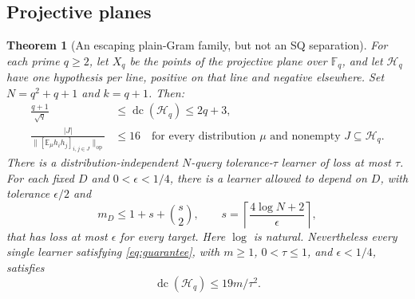 \documentclass[11pt]{article}
\newtheorem{theorem}{Theorem}
\DeclareMathOperator{\dc}{dc}
\newcommand{\E}{\mathbb E}
\newcommand{\1}{\mathbf 1}
\newcommand{\cH}{\mathcal H}
\newcommand{\op}{\mathrm{op}}
\begin{document}
\subsection{Projective planes}
\begin{samepage}
\begin{theorem}[An escaping plain-Gram family, but not an SQ separation]\label{thm:plane}
For each prime $q\geq2$, let $X_q$ be the points of the projective plane over $\mathbb F_q$, and let $\cH_q$ have one hypothesis per line, positive on that line and negative elsewhere. Set $N=q^2+q+1$ and $k=q+1$. Then:
\begin{align}
 \frac{q+1}{\sqrt q}&\leq\dc(\cH_q)\leq2q+3,\label{eq:planedc}\\
 \frac{|J|}{\|[\E_\mu h_i h_j]_{i,j\in J}\|_\op}&\leq16
 \quad\text{for every distribution $\mu$ and nonempty $J\subseteq\cH_q$}.
 \label{eq:planeplain}
\end{align}
There is a distribution-independent $N$-query tolerance-$\tau$ learner of loss at most $\tau$. For each \emph{fixed} $D$ and $0<\epsilon<1/4$, there is a learner allowed to depend on $D$, with tolerance $\epsilon/2$ and
\[
 m_D\leq1+s+\binom{s}{2},\qquad
 s=\left\lceil\frac{4\log N+2}{\epsilon}\right\rceil,
\]
that has loss at most $\epsilon$ for every target. Here $\log$ is natural.
Nevertheless every \emph{single} learner satisfying \eqref{eq:guarantee}, with $m\geq1$, $0<\tau\leq1$, and $\epsilon<1/4$, satisfies
\begin{equation}\label{eq:plane19}
 \dc(\cH_q)\leq19m/\tau^2.
\end{equation}
\end{theorem}
\end{samepage}
\end{document}

